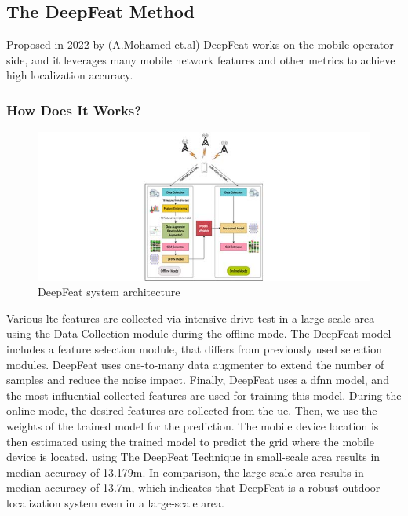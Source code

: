\subsection{The DeepFeat Method}
Proposed in 2022 by (A.Mohamed et.al)\cite{amel} DeepFeat works on the mobile operator side, and it leverages many mobile network features and other metrics to achieve high localization accuracy.

\subsubsection{How Does It Works?}
\begin{figure}
    \centering
    \includegraphics[scale = 2]{images/access-gagraphic-3140292.jpg}
    \caption{DeepFeat system architecture}
    \label{fig:dpft_sys_arch}
\end{figure}

Various \ac{lte} features are collected via intensive drive test in a large-scale area using the Data Collection module during the offline mode.
The DeepFeat model includes a feature selection module, that differs from previously used selection modules.
DeepFeat uses one-to-many data augmenter to extend the number of samples and reduce the noise impact.
Finally, DeepFeat uses a \ac{dfnn} model, and the most influential collected features are used for training this model.
During the online mode, the desired features are collected from the \ac{ue}.
Then, we use the weights of the trained model for the prediction.
The mobile device location is then estimated using the trained model to predict the grid where the mobile device is located.
using The DeepFeat Technique in small-scale area results in median accuracy of 13.179m.
In comparison, the large-scale area results in median accuracy of 13.7m, which indicates that DeepFeat is a robust outdoor localization system even in a large-scale area.